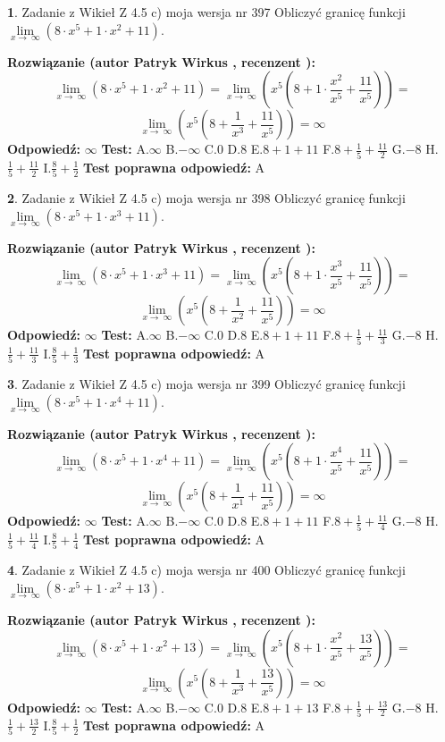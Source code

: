 \documentclass[12pt, a4paper]{article}
\theoremstyle{definition} %
\newtheorem{zad}{}
\newcommand{\zadStart}[1]{\begin{zad}#1\newline}
\newcommand{\zadStop}{\end{zad}}
\newcommand{\rozwStart}[2]{\noindent \textbf{Rozwiązanie (autor #1 , recenzent #2): }\newline}
\newcommand{\rozwStop}{\newline}
\newcommand{\odpStart}{\noindent \textbf{Odpowiedź:}\newline}
\newcommand{\odpStop}{\newline}
\newcommand{\testStart}{\noindent \textbf{Test:}\newline}
\newcommand{\testStop}{\newline}
\newcommand{\kluczStart}{\noindent \textbf{Test poprawna odpowiedź:}\newline}
\newcommand{\kluczStop}{\newline}
\begin{document}
\zadStart{Zadanie z Wikieł Z 4.5 c) moja wersja nr 397}
Obliczyć granicę funkcji  $\lim\limits_{x\to\ \infty}(8 \cdot x^{5}+1 \cdot x^{2}+11)$.
\zadStop
\rozwStart{Patryk Wirkus}{}
$$\lim\limits_{x\to\ \infty}(8 \cdot x^{5}+1 \cdot x^{2}+11) = \lim\limits_{x\to\ \infty}(x^{5}(8 +1 \cdot \frac{x^{2}}{x^{5}}+\frac{11}{x^{5}})) =$$ $$\lim\limits_{x\to\ \infty}(x^{5}(8 +\frac{1}{x^{3}}+\frac{11}{x^{5}})) =\infty$$
\rozwStop
\odpStart
$\infty$
\odpStop
\testStart
A.$\infty$ B.$-\infty$ C.$0$ D.$8$ E.$8 + 1 + 11$
F.$8+\frac{1}{5}+\frac{11}{2}$ G.$-8$
H.$\frac{1}{5}+\frac{11}{2}$
I.$\frac{8}{5}+\frac{1}{2}$
\testStop
\kluczStart
A
\kluczStop



\zadStart{Zadanie z Wikieł Z 4.5 c) moja wersja nr 398}
Obliczyć granicę funkcji  $\lim\limits_{x\to\ \infty}(8 \cdot x^{5}+1 \cdot x^{3}+11)$.
\zadStop
\rozwStart{Patryk Wirkus}{}
$$\lim\limits_{x\to\ \infty}(8 \cdot x^{5}+1 \cdot x^{3}+11) = \lim\limits_{x\to\ \infty}(x^{5}(8 +1 \cdot \frac{x^{3}}{x^{5}}+\frac{11}{x^{5}})) =$$ $$\lim\limits_{x\to\ \infty}(x^{5}(8 +\frac{1}{x^{2}}+\frac{11}{x^{5}})) =\infty$$
\rozwStop
\odpStart
$\infty$
\odpStop
\testStart
A.$\infty$ B.$-\infty$ C.$0$ D.$8$ E.$8 + 1 + 11$
F.$8+\frac{1}{5}+\frac{11}{3}$ G.$-8$
H.$\frac{1}{5}+\frac{11}{3}$
I.$\frac{8}{5}+\frac{1}{3}$
\testStop
\kluczStart
A
\kluczStop



\zadStart{Zadanie z Wikieł Z 4.5 c) moja wersja nr 399}
Obliczyć granicę funkcji  $\lim\limits_{x\to\ \infty}(8 \cdot x^{5}+1 \cdot x^{4}+11)$.
\zadStop
\rozwStart{Patryk Wirkus}{}
$$\lim\limits_{x\to\ \infty}(8 \cdot x^{5}+1 \cdot x^{4}+11) = \lim\limits_{x\to\ \infty}(x^{5}(8 +1 \cdot \frac{x^{4}}{x^{5}}+\frac{11}{x^{5}})) =$$ $$\lim\limits_{x\to\ \infty}(x^{5}(8 +\frac{1}{x^{1}}+\frac{11}{x^{5}})) =\infty$$
\rozwStop
\odpStart
$\infty$
\odpStop
\testStart
A.$\infty$ B.$-\infty$ C.$0$ D.$8$ E.$8 + 1 + 11$
F.$8+\frac{1}{5}+\frac{11}{4}$ G.$-8$
H.$\frac{1}{5}+\frac{11}{4}$
I.$\frac{8}{5}+\frac{1}{4}$
\testStop
\kluczStart
A
\kluczStop



\zadStart{Zadanie z Wikieł Z 4.5 c) moja wersja nr 400}
Obliczyć granicę funkcji  $\lim\limits_{x\to\ \infty}(8 \cdot x^{5}+1 \cdot x^{2}+13)$.
\zadStop
\rozwStart{Patryk Wirkus}{}
$$\lim\limits_{x\to\ \infty}(8 \cdot x^{5}+1 \cdot x^{2}+13) = \lim\limits_{x\to\ \infty}(x^{5}(8 +1 \cdot \frac{x^{2}}{x^{5}}+\frac{13}{x^{5}})) =$$ $$\lim\limits_{x\to\ \infty}(x^{5}(8 +\frac{1}{x^{3}}+\frac{13}{x^{5}})) =\infty$$
\rozwStop
\odpStart
$\infty$
\odpStop
\testStart
A.$\infty$ B.$-\infty$ C.$0$ D.$8$ E.$8 + 1 + 13$
F.$8+\frac{1}{5}+\frac{13}{2}$ G.$-8$
H.$\frac{1}{5}+\frac{13}{2}$
I.$\frac{8}{5}+\frac{1}{2}$
\testStop
\kluczStart
A
\kluczStop
\end{document}

